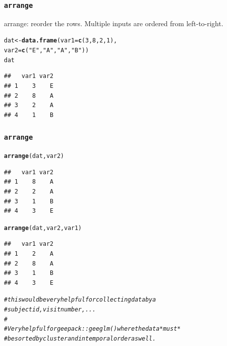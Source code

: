 \documentclass{beamer}\usepackage[]{graphicx}\usepackage[]{color}
\makeatletter
\newcommand{\hlnum}[1]{\textcolor[rgb]{0.686,0.059,0.569}{#1}}%
\newcommand{\hlstr}[1]{\textcolor[rgb]{0.192,0.494,0.8}{#1}}%
\newcommand{\hlcom}[1]{\textcolor[rgb]{0.678,0.584,0.686}{\textit{#1}}}%
\newcommand{\hlstd}[1]{\textcolor[rgb]{0.345,0.345,0.345}{#1}}%
\newcommand{\hlkwb}[1]{\textcolor[rgb]{0.69,0.353,0.396}{#1}}%
\newcommand{\hlkwc}[1]{\textcolor[rgb]{0.333,0.667,0.333}{#1}}%
\newcommand{\hlkwd}[1]{\textcolor[rgb]{0.737,0.353,0.396}{\textbf{#1}}}%
\newenvironment{kframe}{%
 \def\at@end@of@kframe{}%
 \ifinner\ifhmode%
  \def\at@end@of@kframe{\end{minipage}}%
  \begin{minipage}{\columnwidth}%
 \fi\fi%
 \def\FrameCommand##1{\hskip\@totalleftmargin \hskip-\fboxsep
 \colorbox{shadecolor}{##1}\hskip-\fboxsep
     \hskip-\linewidth \hskip-\@totalleftmargin \hskip\columnwidth}%
 \MakeFramed {\advance\hsize-\width
   \@totalleftmargin\z@ \linewidth\hsize
   \@setminipage}}%
 {\par\unskip\endMakeFramed%
 \at@end@of@kframe}
\newenvironment{knitrout}{}{} %
\makeatother
\begin{document}
\begin{frame}[fragile]
  \frametitle{{\tt arrange}}
arrange: reorder the rows. Multiple inputs are ordered from left-to-right.
\begin{knitrout}\footnotesize
{}\color{fgcolor}\begin{kframe}
\begin{alltt}
\hlstd{dat} \hlkwb{<-} \hlkwd{data.frame}\hlstd{(}\hlkwc{var1} \hlstd{=} \hlkwd{c}\hlstd{(}\hlnum{3}\hlstd{,} \hlnum{8}\hlstd{,} \hlnum{2}\hlstd{,} \hlnum{1}\hlstd{),}
                  \hlkwc{var2} \hlstd{=} \hlkwd{c}\hlstd{(}\hlstr{"E"}\hlstd{,} \hlstr{"A"}\hlstd{,} \hlstr{"A"}\hlstd{,} \hlstr{"B"}\hlstd{))}
\hlstd{dat}
\end{alltt}
\begin{verbatim}
##   var1 var2
## 1    3    E
## 2    8    A
## 3    2    A
## 4    1    B
\end{verbatim}
\end{kframe}
\end{knitrout}
\end{frame} 

\begin{frame}[fragile]
  \frametitle{{\tt arrange}}
\begin{knitrout}\footnotesize
{}\color{fgcolor}\begin{kframe}
\begin{alltt}
\hlkwd{arrange}\hlstd{(dat, var2)}
\end{alltt}
\begin{verbatim}
##   var1 var2
## 1    8    A
## 2    2    A
## 3    1    B
## 4    3    E
\end{verbatim}
\begin{alltt}
\hlkwd{arrange}\hlstd{(dat, var2, var1)}
\end{alltt}
\begin{verbatim}
##   var1 var2
## 1    2    A
## 2    8    A
## 3    1    B
## 4    3    E
\end{verbatim}
\begin{alltt}
\hlcom{# this would be very helpful for collecting data by a}
\hlcom{# subject id, visit number, ...}
\hlcom{#}
\hlcom{# Very helpful for geepack::geeglm() where the data *must* }
\hlcom{# be sorted by cluster and in temporal order as well.}
\end{alltt}
\end{kframe}
\end{knitrout}
\end{frame} 
\end{document}
